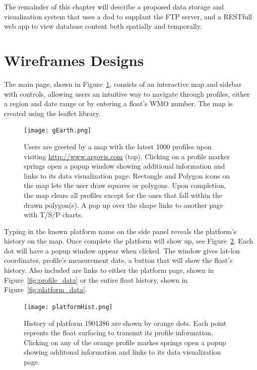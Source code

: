 The remainder of this chapter will describe a proposed data storage and visualization system that uses a \gls{dod} to supplant the FTP server, and a RESTfull web app to view database content both spatially and temporally.

\section{Wireframes Designs}
The main page, shown in Figure~\ref{fig:main_page}, consists of an interactive map and sidebar with controls, allowing users an intuitive way to navigate through profiles, either a region and date range or by entering a float's WMO number. The map is created using the \gls{leaflet} library.

\begin{figure}[ht]
\begin{minipage}{6in}
\centering
\texttt{[image: gEarth.png]}
\caption{\label{fig:main_page} Users are greeted by a map with the latest 1000 profiles upon visiting \url{http://www.argovis.com} (top). Clicking on a profile marker springs open a popup window showing additional information and links to its data visualization page. Rectangle and Polygon icons on the map lets the user draw squares or polygons. Upon completion, the map clears all profiles except for the ones that fall within the drawn polygon(s). A pop up over the shape links to another page with T/S/P charts.}
\end{minipage}
\end{figure}
Typing in the known platform name on the side panel reveals the platform's history on the map. Once complete the platform will show up, see Figure~\ref{fig:prof_hist}. Each dot will have a popup window appear when clicked. The window gives lat-lon coordinates, profile's measurement date, a button that will show the float's history. Also included are links to either the platform page, shown in Figure~\ref{fig:profile_data} or the entire float history, shown in Figure~\ref{fig:platform_data}.

\begin{figure}[ht]
\centering
\begin{minipage}{6in}
\texttt{[image: platformHist.png]}
\caption{\label{fig:prof_hist} History of platform 1901386 are shown by orange dots. Each point reprents the float surfacing to transmit its profile information. Clicking on any of the orange profile markes springs open a popup showing additonal information and links to its data visualization page.}
\end{minipage}
\end{figure}

